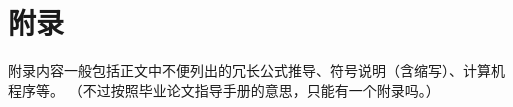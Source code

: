 \documentclass[zihao = -4, linespread = 1.5]{ctexart} %
\begin{document}
\clearpage

\setcounter{secnumdepth}{0} %
\section{\texorpdfstring{附\quad 录}{附录}}
附录内容一般包括正文中不便列出的冗长公式推导、符号说明（含缩写）、计算机程序等。
（不过按照毕业论文指导手册的意思，只能有一个附录吗。）
\end{document}
